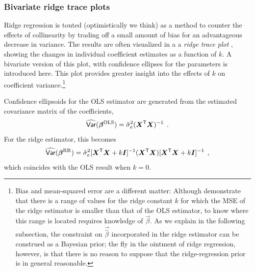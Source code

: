 \subsubsection{Bivariate ridge trace plots}\label{sec:ridge2}

Ridge regression is touted (optimistically we think) as a method to counter the effects
of collinearity by trading off a small amount of bias for an
advantageous decrease in variance.  The results are often
visualized in a a \emph{ridge trace plot}
\citep{HoerlKennard:1970b},
showing the changes
in individual coefficient estimates as a function of $k$.
A bivariate version of this plot, with confidence ellipses for
the parameters is introduced here.  This plot provides greater
insight into the effects of $k$ on coefficient variance.\footnote{Bias and mean-squared error are a different matter: Although \citet{HoerlKennard:1970a} demonstrate that there is a range of values for the ridge constant $k$ for which the MSE of the ridge estimator is smaller than that of the OLS estimator, to know where this range is located requires knowledge of $\vec{\beta}$. As we explain in the following subsection, the constraint on $\vec{\hat{\beta}}$ incorporated in the ridge estimator can be construed as a Bayesian prior; the fly in the ointment of ridge regression, however, is that there is no reason to suppose that the ridge-regression prior is in general reasonable.}

Confidence ellipsoids for the OLS estimator are generated
from the estimated covariance matrix of the coefficients,
\begin{equation*}
\widehat{\mathsf{Var}} (\bm{\beta}^{\mathrm{OLS}}) = \hat{\sigma}^2_e (\bm{X}^\mathsf{T} \bm{X})^{-1} \:\: .
\end{equation*}
For the ridge estimator, this becomes
\citep{Marquardt:1970}
\begin{equation}
\widehat{\mathsf{Var}} (\bm{\beta}^{\mathrm{RR}}) = \hat{\sigma}^2_e
    [\bm{X}^\mathsf{T} \bm{X} + k \bm{I}]^{-1}
    (\bm{X}^\mathsf{T} \bm{X})
    [\bm{X}^\mathsf{T} \bm{X} + k \bm{I}]^{-1} \:\: ,
\end{equation}
which coincides with the OLS result when $k=0$.
	
